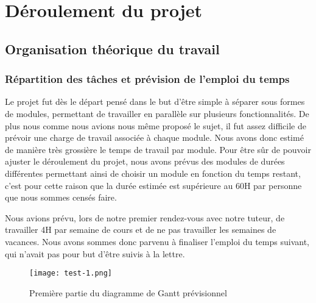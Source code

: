 \graphicspath{{Others/}}

\section{Déroulement du projet}
\subsection{Organisation théorique du travail}
\subsubsection{Répartition des tâches et prévision de l'emploi du temps}
Le projet fut dès le départ pensé dans le but d'être simple à séparer sous formes de modules, permettant de travailler en parallèle sur plusieurs fonctionnalités.
De plus nous comme nous avions nous même proposé le sujet, il fut assez difficile de prévoir une charge de travail associée à chaque module. Nous avons donc estimé 
de manière très grossière le temps de travail par module. Pour être sûr de pouvoir ajuster le déroulement du projet, nous avons prévus des modules de durées différentes permettant ainsi
de choisir un module en fonction du temps restant, c'est pour cette raison que la durée estimée est supérieure au 60H par personne que nous sommes censés faire.
\par
Nous avions prévu, lors de notre premier rendez-vous avec notre tuteur, de travailler 4H par semaine de cours et de ne pas travailler les semaines de vacances.
Nous avons sommes donc parvenu à finaliser l'emploi du temps suivant, qui n'avait pas pour but d'être suivis à la lettre.
\vfill
\begin{figure}[!h]
    \begin{center}
        \texttt{[image: test-1.png]}
        \caption{Première partie du diagramme de Gantt prévisionnel}
    \end{center}
\end{figure}
